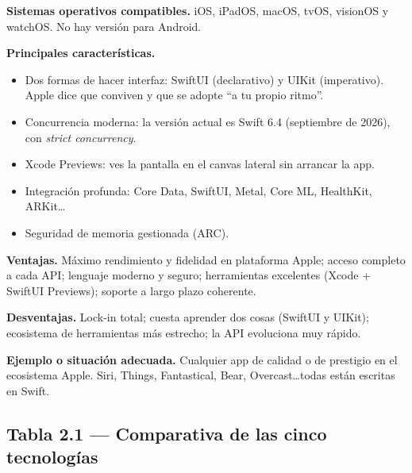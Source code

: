 \documentclass[11pt,a4paper]{article}
\newcommand{\campo}[1]{\textbf{\color{navy}#1}}
\begin{document}
	\campo{Sistemas operativos compatibles.} iOS, iPadOS, macOS, tvOS, visionOS y watchOS. No hay versión para Android.
	
	\campo{Principales características.}
	\begin{itemize}[leftmargin=*,itemsep=0.2em,topsep=0.2em]
		\item Dos formas de hacer interfaz: SwiftUI (declarativo) y UIKit (imperativo). Apple dice que conviven y que se adopte \enquote{a tu propio ritmo}.
		\item Concurrencia moderna: la versión actual es Swift 6.4 (septiembre de 2026), con \emph{strict concurrency}.
		\item Xcode Previews: ves la pantalla en el canvas lateral sin arrancar la app.
		\item Integración profunda: Core Data, SwiftUI, Metal, Core ML, HealthKit, ARKit\ldots
		\item Seguridad de memoria gestionada (ARC).
	\end{itemize}
	
	\campo{Ventajas.} Máximo rendimiento y fidelidad en plataforma Apple; acceso completo a cada API; lenguaje moderno y seguro; herramientas excelentes (Xcode + SwiftUI Previews); soporte a largo plazo coherente.
	
	\campo{Desventajas.} Lock-in total; cuesta aprender dos cosas (SwiftUI y UIKit); ecosistema de herramientas más estrecho; la API evoluciona muy rápido.
	
	\campo{Ejemplo o situación adecuada.} Cualquier app de calidad o de prestigio en el ecosistema Apple. Siri, Things, Fantastical, Bear, Overcast\ldots todas están escritas en Swift.
	
	\subsection*{Tabla 2.1 --- Comparativa de las cinco tecnologías}
	
\end{document}
